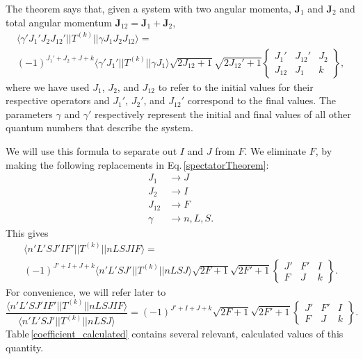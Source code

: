 The theorem says that, given a system with two angular momenta, $\mathbf{J}_1$ and $\mathbf{J}_2$ and total angular momentum $\mathbf{J}_{12}=\mathbf{J}_1+\mathbf{J}_2$,
\begin{multline}\label{spectatorTheorem}
\langle\gamma' J_1'J_2J_{12}'||T^{(k)}||\gamma J_1 J_2 J_{12}\rangle=
\\(-1)^{J_1'+J_2+J+k}\langle\gamma'J_1'||T^{(k)}||\gamma J_1\rangle
\sqrt{2J_{12}+1}\sqrt{2J_{12}'+1}
\begin{Bmatrix}
J_1' & J_{12}' & J_2 \\
J_{12} & J_1 & k
\end{Bmatrix},
\end{multline}
where we have used $J_{1}$, $J_{2}$, and $J_{12}$ to refer to the initial values for their respective operators and $J_{1}'$, $J_{2}'$, and $J_{12}'$ correspond to the final values. The parameters $\gamma$ and $\gamma'$ respectively represent the initial and final values of all other quantum numbers that describe the system.

We will use this formula to separate out $I$ and $J$ from $F$.
We eliminate $F$, by making the following replacements in Eq.\,\ref{spectatorTheorem}:
\begin{align}
J_1&\rightarrow J\\
J_2&\rightarrow I\\
J_{12}&\rightarrow F\\
\gamma &\rightarrow  n,L,S.
\end{align}
This gives 
\begin{multline}\label{spectatorTheorem1}
\langle n' L' S J' I F'||T^{(k)}||n L S J I F\rangle=
\\(-1)^{J'+I+J+k}\langle n'L' S J'||T^{(k)}|| n L S J\rangle
\sqrt{2F+1}\sqrt{2F'+1}
\begin{Bmatrix}
J' & F' & I \\
F & J & k
\end{Bmatrix}.
\end{multline}
For convenience, we will refer later to 
\begin{equation}
\frac{\langle n' L' S J' I F'||T^{(k)}||n L S J I F\rangle}{\langle n'L' S J'||T^{(k)}|| n L S J\rangle}=(-1)^{J'+I+J+k}\sqrt{2F+1}\sqrt{2F'+1}
\begin{Bmatrix}
J' & F' & I \\
F & J & k
\end{Bmatrix}.
\label{afterSpectators}
\end{equation} 
Table\,\ref{coefficient_calculated} contains several relevant, calculated values of this quantity.

